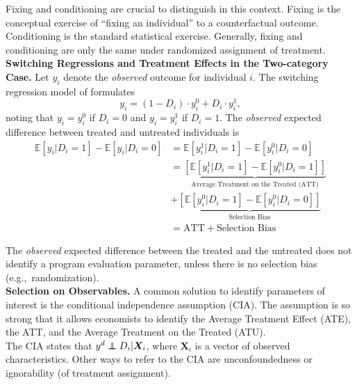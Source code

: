 \noindent Fixing and conditioning are crucial to distinguish in this context. Fixing is the conceptual exercise of ``fixing an individual'' to a counterfactual outcome. Conditioning is the standard statistical exercise. Generally, fixing and conditioning are only the same under randomized assignment of treatment.\\

\noindent \textbf{Switching Regressions and Treatment Effects in the Two-category Case.} Let $y_{i}$ denote the \textit{observed} outcome for individual $i$. The switching regression model of \citet{quandt_new_1972} formulates  
\begin{equation} 
y_{i} =  \left( 1 - D_{i} \right) \cdot y_{i}^0 + D_{i} \cdot y_{i}^1,
\end{equation}
\noindent noting that $y_{i} =  y_{i}^0$ if $D_i = 0$ and $y_{i} =  y_{i}^1$ if $D_i = 1$. The \textit{observed} expected difference between treated and untreated individuals is
\begin{align}
\mathbb{E} \left[ y_{i} | D_{i} = 1 \right] - \mathbb{E} \left[ y_{i} | D_{i} = 0 \right] &= \mathbb{E} \left[ y_{i}^1 | D_{i} = 1 \right] - \mathbb{E} \left[ y_{i}^0 | D_{i} = 0 \right] \nonumber \\
&= \underbrace{\left[ \mathbb{E} \left[ y_{i}^1 | D_{i} = 1 \right] - \mathbb{E} \left[ y_{i}^0 | D_{i} = 1 \right] \right]}_{\text{Average Treatment on the Treated (ATT)}} \nonumber \\ 
&+  \underbrace{\left[ \mathbb{E} \left[ y_{i}^0 | D_{i} = 1 \right] - \mathbb{E} \left[ y_{i}^0 | D_{i} = 0 \right] \right]}_{\text{Selection Bias}} \nonumber \\
&=  \text{ATT} + \text{Selection Bias}
\end{align}

\noindent The \textit{observed} expected difference between the treated and the untreated does not identify a program evaluation parameter, unless there is no selection bias (e.g.,\ randomization).\\

\noindent \textbf{Selection on Observables.} A common solution to identify parameters of interest is the conditional independence assumption (CIA). The assumption is so strong that it allows economists to identify the Average Treatment Effect (ATE), the ATT, and the Average Treatment on the Treated (ATU).\\ 

\noindent The CIA states that $y^d \independent D_{i} | \bm{X}_{i}$, where $ \bm{X}_i $ is a vector of observed characteristics. Other ways to refer to the CIA are unconfoundedness or ignorability (of treatment assignment).\\

